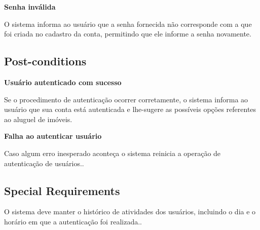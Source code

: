 \textbf{Senha inválida}

O sistema informa ao usuário que a senha fornecida não corresponde com a que foi criada no
cadastro da conta, permitindo que ele informe a senha novamente.

\subsection*{Post-conditions}

\textbf{Usuário autenticado com sucesso}

Se o procedimento de autenticação ocorrer corretamente, o sistema informa ao usuário que sua
conta está autenticada e lhe-sugere as possíveis opções referentes ao aluguel de imóveis.

\textbf{Falha ao autenticar usuário}

Caso algum erro inesperado aconteça o sistema reinicia a operação de autenticação de
usuários..

\subsection*{Special Requirements} 
O sistema deve manter o histórico de atividades dos usuários, incluindo o dia e o horário em que a
autenticação foi realizada..
